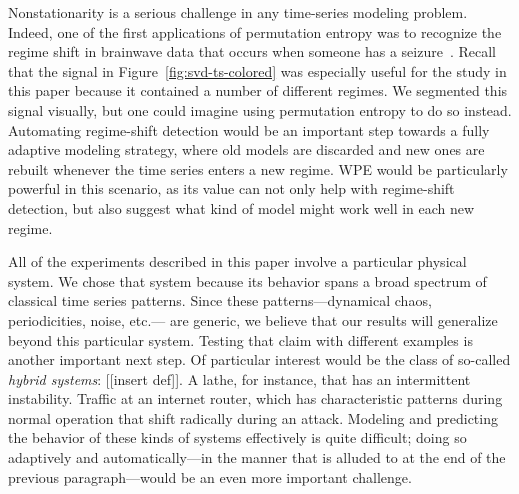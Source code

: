 Nonstationarity is a serious challenge in any time-series modeling
problem.  Indeed, one of the first applications of permutation entropy
was to recognize the regime shift in brainwave data that occurs when
someone has a seizure~\cite{cao2004det}.  Recall that the signal in
Figure~\ref{fig:svd-ts-colored} was especially useful for the study in
this paper because it contained a number of different regimes.  We
segmented this signal visually, but one could imagine using
permutation entropy to do so instead.  Automating regime-shift
detection would be an important step towards a fully adaptive modeling
strategy, where old models are discarded and new ones are rebuilt
whenever the time series enters a new regime.  WPE would be
particularly powerful in this scenario, as its value can not only help
with regime-shift detection, but also suggest what kind of model might
work well in each new regime.

All of the experiments described in this paper involve a particular
physical system.  We chose that system because its behavior spans a
broad spectrum of classical time series patterns.  Since these
patterns---dynamical chaos, periodicities, noise, etc.--- are generic,
we believe that our results will generalize beyond this particular
system.  Testing that claim with different examples is another
important next step.  Of particular interest would be the class of
so-called \emph{hybrid systems}: [[insert def]].  A lathe, for
instance, that has an intermittent instability.  Traffic at an
internet router, which has characteristic patterns during normal
operation that shift radically during an attack.  Modeling and
predicting the behavior of these kinds of systems effectively is quite
difficult; doing so adaptively and automatically---in the manner that
is alluded to at the end of the previous paragraph---would be an even
more important challenge.

